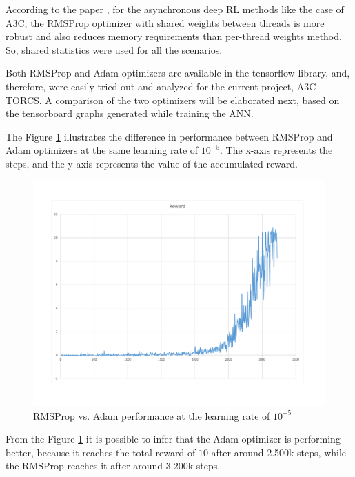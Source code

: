 According to the paper \cite{DBLP:journals/corr/MnihBMGLHSK16}, for the asynchronous deep RL methods like the case of A3C, the RMSProp optimizer with shared weights between threads is more robust and also reduces memory requirements than per-thread weights method. So, shared statistics were used for all the scenarios.

Both RMSProp and Adam optimizers are available in the tensorflow library, and, therefore, were easily tried out and analyzed for the current project, A3C TORCS. A comparison of the two optimizers will be elaborated next, based on the tensorboard graphs generated while training the ANN.

The Figure \ref{fig:RMSPropReward} illustrates the difference in performance between RMSProp and Adam optimizers at the same learning rate of $10^{-5}$. The x-axis represents the steps, and the y-axis represents the value of the accumulated reward.
\begin{figure}[H]
	\centering
	\includegraphics[width=\textwidth]{Figures/RMSPropReward}
	\caption{RMSProp vs. Adam performance at the learning rate of $10^{-5}$}
	\label{fig:RMSPropReward}
\end{figure}
From the Figure \ref{fig:RMSPropReward} it is possible to infer that the Adam optimizer is performing better, because it reaches the total reward of $10$ after around 2.500k steps, while the RMSProp reaches it after around 3.200k steps. 